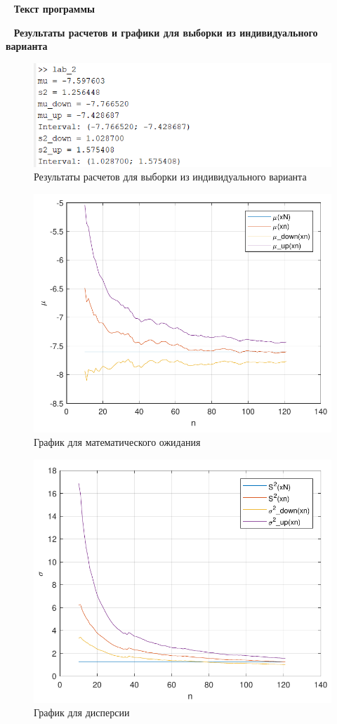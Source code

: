\documentclass{bmstu}
\begin{document}
~
\textbf{\LARGE{Текст программы}}
~



~
\textbf{\LARGE{Результаты расчетов и графики для выборки из индивидуального варианта}}
~

\begin{figure}[H]
	\centering
	\includegraphics[width=\textwidth]{img/res.png}
	\caption{Результаты расчетов для выборки из индивидуального варианта}
\end{figure}

\begin{figure}[H]
	\centering
	\includegraphics[width=\textwidth]{img/graph1.pdf}
	\caption{График для математического ожидания}
\end{figure}

\begin{figure}[H]
	\centering
	\includegraphics[width=\textwidth]{img/graph2.pdf}
	\caption{График для дисперсии}
\end{figure}
\end{document}
